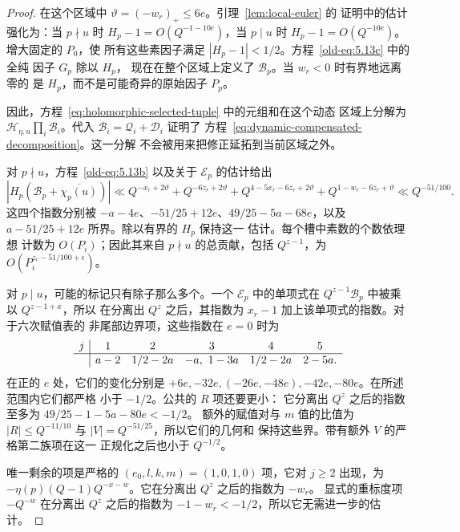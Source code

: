 \documentclass[11pt,a4paper]{article}
\numberwithin{equation}{section}
\numberwithin{figure}{section}
\theoremstyle{definition}
\theoremstyle{remark}
\begin{document}
\begin{proof}
在这个区域中 $\vartheta=(-w_r)_+\le6e$。引理~\ref{lem:local-euler} 的
证明中的估计强化为：当 $p\nmid u$ 时
$H_p-1=O(Q^{-1-10e})$，当 $p\mid u$ 时
$H_p-1=O(Q^{-10e})$。增大固定的 $P_0$，使
所有这些素因子满足 $|H_p-1|<1/2$。方程~\eqref{old-eq:5.13c} 中的全纯
因子 $G_p$ 除以 $H_p$，
现在在整个区域上定义了 $\mathcal B_p$。当 $w_r<0$ 时有界地远离零的
是 $H_p$，而不是可能奇异的原始因子 $P_p$。

因此，方程~\eqref{eq:holomorphic-selected-tuple} 中的元组和在这个动态
区域上分解为 $\mathcal H_{\eta,u}\prod_i\mathcal B_i$。代入
$\mathcal B_i=\mathcal Q_i+\mathcal D_i$ 证明了
方程~\eqref{eq:dynamic-compensated-decomposition}。这一分解
不会被用来把修正延拓到当前区域之外。

对 $p\nmid u$，方程~\eqref{old-eq:5.13b} 以及关于
$\mathcal E_p$ 的估计给出
\[
 |H_p(\mathcal B_p+\overline{\chi_p(u)})|
 \ll Q^{-x_r+2\vartheta}+Q^{-6z_r+2\vartheta}
       +Q^{4-5x_r-6z_r+2\vartheta}
       +Q^{1-w_r-6z_r+\vartheta}
 \ll Q^{-51/100}.
\]
这四个指数分别被
$-a-4e$、$-51/25+12e$、$49/25-5a-68e$，以及
$a-51/25+12e$ 所界。除以有界的 $H_p$ 保持这一
估计。每个槽中素数的个数依理想
计数为 $O(P_i)$；因此其来自 $p\nmid u$ 的总贡献，包括
$Q^{z-1}$，为 $O(P_i^{z_r-51/100+\epsilon})$。

对 $p\mid u$，可能的标记只有除子那么多个。一个
$\mathcal E_p$ 中的单项式在 $Q^{z-1}\mathcal B_p$ 中被乘以 $Q^{z-1+x}$，所以
在分离出 $Q^z$ 之后，其指数为 $x_r-1$ 加上该单项式的指数。对于六次赋值表的
非尾部边界项，这些指数在
$e=0$ 时为
\[
\begin{array}{c|ccccc}
 j&1&2&3&4&5\\\hline
 &a-2&1/2-2a&-a,\ 1-3a&1/2-2a&2-5a.
\end{array}
\]
在正的 $e$ 处，它们的变化分别是
$+6e,-32e,(-26e,-48e),-42e,-80e$。在所述范围内它们都严格
小于 $-1/2$。公共的 $R$ 项还要更小：
它分离出 $Q^z$ 之后的指数至多为 $49/25-1-5a-80e<-1/2$。
额外的赋值对与 $m$ 值的比值为
$|R|\le Q^{-11/10}$ 与 $|V|=Q^{-51/25}$，所以它们的几何和
保持这些界。带有额外
$V$ 的严格第二族项在这一
正规化之后也小于 $Q^{-1/2}$。

唯一剩余的项是严格的
$(e_0,l,k,m)=(1,0,1,0)$ 项，它对 $j\ge2$ 出现，为
$-\eta(p)(Q-1)Q^{-x-w}$。它在分离出 $Q^z$ 之后的指数为 $-w_r$。
显式的重标度项 $-Q^{-w}$ 在分离出 $Q^z$ 之后的指数为
$-1-w_r<-1/2$，所以它无需进一步的估计。


\end{proof}
\end{document}
